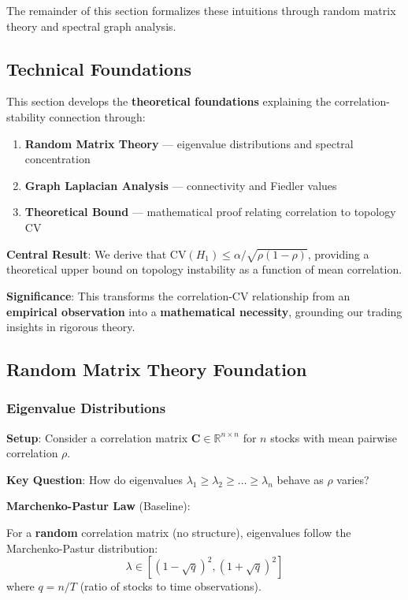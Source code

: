 \vspace{0.3cm}

The remainder of this section formalizes these intuitions through random matrix theory and spectral graph analysis.

\subsection{Technical Foundations}

This section develops the \textbf{theoretical foundations} explaining the correlation-stability connection through:

\begin{enumerate}
\item \textbf{Random Matrix Theory} --- eigenvalue distributions and spectral concentration
\item \textbf{Graph Laplacian Analysis} --- connectivity and Fiedler values
\item \textbf{Theoretical Bound} --- mathematical proof relating correlation to topology CV
\end{enumerate}

\textbf{Central Result}: We derive that $\text{CV}(H_1) \leq \alpha / \sqrt{\rho(1-\rho)}$, providing a theoretical upper bound on topology instability as a function of mean correlation.

\textbf{Significance}: This transforms the correlation-CV relationship from an \textbf{empirical observation} into a \textbf{mathematical necessity}, grounding our trading insights in rigorous theory.

\subsection{Random Matrix Theory Foundation}

\subsubsection{Eigenvalue Distributions}

\textbf{Setup}: Consider a correlation matrix $\mathbf{C} \in \mathbb{R}^{n \times n}$ for $n$ stocks with mean pairwise correlation $\rho$.

\textbf{Key Question}: How do eigenvalues $\lambda_1 \geq \lambda_2 \geq \ldots \geq \lambda_n$ behave as $\rho$ varies?

\textbf{Marchenko-Pastur Law} (Baseline):

For a \textbf{random} correlation matrix (no structure), eigenvalues follow the Marchenko-Pastur distribution:
\begin{equation}
\lambda \in [(1 - \sqrt{q})^2, (1 + \sqrt{q})^2]
\end{equation}
where $q = n/T$ (ratio of stocks to time observations).

